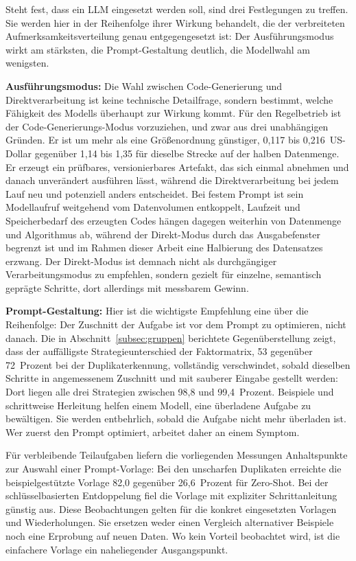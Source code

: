 Steht fest, dass ein \ac{LLM} eingesetzt werden soll, sind drei Festlegungen zu treffen. Sie werden hier in der Reihenfolge ihrer Wirkung behandelt, die der verbreiteten Aufmerksamkeitsverteilung genau entgegengesetzt ist: Der Ausführungsmodus wirkt am stärksten, die Prompt-Gestaltung deutlich, die Modellwahl am wenigsten.

\noindent\textbf{Ausführungsmodus:} Die Wahl zwischen Code-Generierung und Direktverarbeitung ist keine technische Detailfrage, sondern bestimmt, welche Fähigkeit des Modells überhaupt zur Wirkung kommt. Für den Regelbetrieb ist der Code-Generierungs-Modus vorzuziehen, und zwar aus drei unabhängigen Gründen. Er ist um mehr als eine Größenordnung günstiger, 0,117 bis 0,216~US-Dollar gegenüber 1,14 bis 1,35 für dieselbe Strecke auf der halben Datenmenge. Er erzeugt ein prüfbares, versionierbares Artefakt, das sich einmal abnehmen und danach unverändert ausführen lässt, während die Direktverarbeitung bei jedem Lauf neu und potenziell anders entscheidet. Bei festem Prompt ist sein Modellaufruf weitgehend vom Datenvolumen entkoppelt, Laufzeit und Speicherbedarf des erzeugten Codes hängen dagegen weiterhin von Datenmenge und Algorithmus ab, während der Direkt-Modus durch das Ausgabefenster begrenzt ist und im Rahmen dieser Arbeit eine Halbierung des Datensatzes erzwang. Der Direkt-Modus ist demnach nicht als durchgängiger Verarbeitungsmodus zu empfehlen, sondern gezielt für einzelne, semantisch geprägte Schritte, dort allerdings mit messbarem Gewinn.

\noindent\textbf{Prompt-Gestaltung:} Hier ist die wichtigste Empfehlung eine über die Reihenfolge: Der Zuschnitt der Aufgabe ist vor dem Prompt zu optimieren, nicht danach. Die in Abschnitt~\ref{subsec:gruppen} berichtete Gegenüberstellung zeigt, dass der auffälligste Strategieunterschied der Faktormatrix, 53 gegenüber 72~Prozent bei der Duplikaterkennung, vollständig verschwindet, sobald dieselben Schritte in angemessenem Zuschnitt und mit sauberer Eingabe gestellt werden: Dort liegen alle drei Strategien zwischen 98,8 und 99,4~Prozent. Beispiele und schrittweise Herleitung helfen einem Modell, eine überladene Aufgabe zu bewältigen. Sie werden entbehrlich, sobald die Aufgabe nicht mehr überladen ist. Wer zuerst den Prompt optimiert, arbeitet daher an einem Symptom.

Für verbleibende Teilaufgaben liefern die vorliegenden Messungen Anhaltspunkte zur Auswahl einer Prompt-Vorlage: Bei den unscharfen Duplikaten erreichte die beispielgestützte Vorlage 82,0 gegenüber 26,6~Prozent für Zero-Shot. Bei der schlüsselbasierten Entdoppelung fiel die Vorlage mit expliziter Schrittanleitung günstig aus. Diese Beobachtungen gelten für die konkret eingesetzten Vorlagen und Wiederholungen. Sie ersetzen weder einen Vergleich alternativer Beispiele noch eine Erprobung auf neuen Daten. Wo kein Vorteil beobachtet wird, ist die einfachere Vorlage ein naheliegender Ausgangspunkt.

